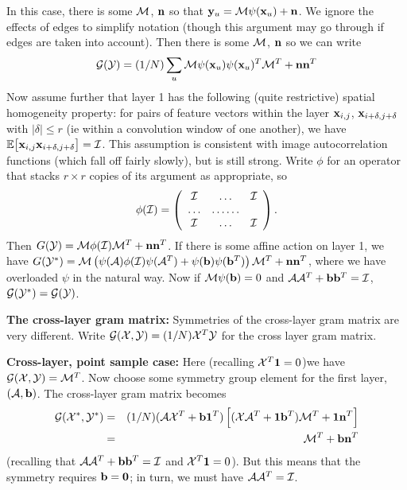 In this case, there is some ${\cal {M}}$, ${\bf {n}}$ so that 
${\bf {y}}_u={\cal {M}}\psi({\bf {x}}_u)+{\bf {n}}$.  We ignore the
effects of edges to simplify notation (though this argument may go
through if edges are taken into account).  Then there is some
${\cal {M}}$, ${\bf {n}}$ so we can write 
\[
{\cal G}({\cal {Y}})=(1/N) \sum_u
{\cal {M}}\psi({\bf {x}}_u)\psi({\bf {x}}_u)^T{\cal {M}}^T+{\bf {n}}{\bf {n}}^T
\]
Now assume further that
layer 1 has the following (quite restrictive) spatial homogeneity
property: for pairs of feature vectors within the layer ${\bf {x}}_{i,j}$, ${\bf {x}}_{i+\delta,
  j+\delta}$ with $\mid \! \delta\!\mid \leq r$ (ie within a convolution window of one
another), we have ${\mathbb{E}}{{\left[{{{\bf {x}}_{i,j}{\bf {x}}_{i+\delta,
    j+\delta}}}\right]}}={\cal {I}}$.  This assumption is consistent with image
autocorrelation functions (which fall off fairly slowly), but is still
strong. Write $\phi$ for an operator
that stacks $r \times r$ copies of its argument as appropriate, so
\[\phi({\cal {I}})=\left(\begin{array}{ccc}
{\cal {I}}&\ldots&{\cal {I}}\\
\ldots &\ldots \ldots \\
{\cal {I}}&\ldots&{\cal {I}}
\end{array}\right).
\]
Then
$G({\cal {Y}})={\cal {M}}\phi({\cal {I}}){\cal {M}}^T+{\bf {n}}{\bf {n}}^T$.
If there is some affine action on layer 1, we have
$G({\cal {Y}}^*)={\cal {M}}\left(\psi({\cal {A}})\phi({\cal {I}})\psi({\cal {A}}^T)+\psi({\bf {b}})\psi({\bf {b}}^T)\right){\cal {M}}^T+{\bf {n}}{\bf {n}}^T$,
where we have overloaded $\psi$ in the natural way.  Now if
${\cal {M}}\psi({\bf {b}})=0$ and ${\cal {A}}{\cal {A}}^T+{\bf {b}}{\bf {b}}^T={\cal {I}}$, ${\cal
  G}({\cal {Y}}^*)={\cal G}({\cal {Y}})$. 



{\bf The cross-layer gram matrix:}  Symmetries of the cross-layer gram matrix are very different.  Write
${\cal G}({\cal {X}}, {\cal {Y}})=(1/N) {\cal {X}}^T{\cal {Y}}$ for
the cross layer gram matrix.  

{\bf Cross-layer, point sample case:} Here (recalling ${\cal {X}}^T{\bf {1}}=0$)we have ${\cal G}({\cal {X}},
{\cal {Y}})={\cal {M}}^T$.    Now choose some symmetry group element for the first layer,
$\left({\cal {A}}, {\bf {b}}\right)$.  The cross-layer gram matrix
becomes 
\begin{eqnarray*}
{\cal G}({\cal {X}}^*, {\cal {Y}}^*)&=&(1/N) ({\cal {A}}
{\cal {X}}^T+{\bf {b}}{\bf {1}}^T)
\left[({\cal {X}}
  {\cal {A}}^T+{\bf {1}}{\bf {b}}^T){\cal {M}}^T+{\bf {1}}{\bf {n}}^T\right]\\
&=&{\cal {M}}^T+{\bf {b}}{\bf {n}}^T
\end{eqnarray*}
(recalling that ${\cal {A}}{\cal {A}}^T+{\bf {b}}{\bf {b}}^T={\cal {I}}$ and
${\cal {X}}^T{\bf {1}}=0$).  But this means that the symmetry requires
${\bf {b}}={\bf {0}}$; in turn, we must have ${\cal {A}}{\cal {A}}^T={\cal {I}}$.


